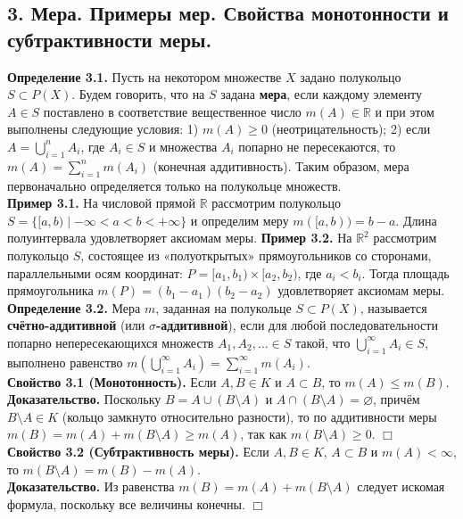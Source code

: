 \documentclass[12pt]{article}
\begin{document}
\subsection*{3. Мера. Примеры мер. Свойства монотонности и субтрактивности меры.}
\textbf{Определение 3.1.} Пусть на некотором множестве $X$ задано полукольцо $S \subset P(X)$. Будем говорить, что на $S$ задана \textbf{мера}, если каждому элементу $A \in S$ поставлено в соответствие вещественное число $m(A) \in \mathbb{R}$ и при этом выполнены следующие условия: 1) $m(A) \ge 0$ (неотрицательность); 2) если $A = \bigcup_{i=1}^{n} A_i$, где $A_i \in S$ и множества $A_i$ попарно не пересекаются, то $m(A) = \sum_{i=1}^{n} m(A_i)$ (конечная аддитивность). Таким образом, мера первоначально определяется только на полукольце множеств.
\\\textbf{Пример 3.1.} На числовой прямой $\mathbb{R}$ рассмотрим полукольцо $S = \{[a, b) \mid -\infty < a < b < +\infty\}$ и определим меру $m([a, b)) = b - a$. Длина полуинтервала удовлетворяет аксиомам меры. \textbf{Пример 3.2.} На $\mathbb{R}^2$ рассмотрим полукольцо $S$, состоящее из «полуоткрытых» прямоугольников со сторонами, параллельными осям координат: $P = [a_1, b_1) \times [a_2, b_2)$, где $a_i < b_i$. Тогда площадь прямоугольника $m(P) = (b_1 - a_1)(b_2 - a_2)$ удовлетворяет аксиомам меры.
 \\\textbf{Определение 3.2.} Мера $m$, заданная на полукольце $S \subset P(X)$, называется \textbf{счётно-аддитивной} (или \textbf{$\sigma$-аддитивной}), если для любой последовательности попарно непересекающихся множеств $A_1, A_2, \ldots \in S$ такой, что $\bigcup_{i=1}^{\infty} A_i \in S$, выполнено равенство $m\left( \bigcup_{i=1}^{\infty} A_i \right) = \sum_{i=1}^{\infty} m(A_i)$.\\ \textbf{Свойство 3.1 (Монотонность).} Если $A, B \in K$ и $A \subset B$, то $m(A) \le m(B)$. \\\textbf{Доказательство.} Поскольку $B = A \cup (B \setminus A)$ и $A \cap (B \setminus A) = \varnothing$, причём $B \setminus A \in K$ (кольцо замкнуто относительно разности), то по аддитивности меры $m(B) = m(A) + m(B \setminus A) \ge m(A)$, так как $m(B \setminus A) \ge 0$. \hfill $\Box$ \\\textbf{Свойство 3.2 (Субтрактивность меры).} Если $A, B \in K$, $A \subset B$ и $m(A) < \infty$, то $m(B \setminus A) = m(B) - m(A)$. \\\textbf{Доказательство.} Из равенства $m(B) = m(A) + m(B \setminus A)$ следует искомая формула, поскольку все величины конечны. \hfill $\Box$
\end{document}
